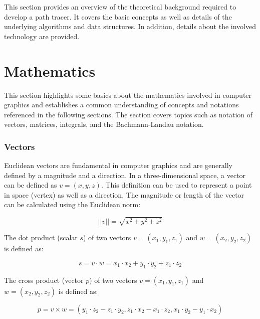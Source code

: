 \label{ch:theory}

This section provides an overview of the theoretical background required to develop a path tracer. It covers the basic concepts as well as details of the underlying algorithms and data structures. In addition, details about the involved technology are provided.

\section{Mathematics}

This section highlights some basics about the mathematics involved in computer graphics and establishes a common understanding of concepts and notations referenced in the following sections. The section covers topics such as notation of vectors, matrices, integrals, and the Bachmann-Landau notation.

\subsubsection{Vectors}

Euclidean vectors are fundamental in computer graphics and are generally defined by a magnitude and a direction. In a three-dimensional space, a vector can be defined as $v = (x, y, z)$. This definition can be used to represent a point in space (vertex) as well as a direction. The magnitude or length of the vector can be calculated using the Euclidean norm:

\begin{equation}
  \label{eqn:euclidean-norm}
  ||v|| = \sqrt{x^2 + y^2 + z^2}
\end{equation}

The dot product (scalar $s$) of two vectors $v = (x_1, y_1, z_1)$ and $w = (x_2, y_2, z_2)$ is defined as:

\begin{equation}
  \label{eqn:dot-product}
  s = v \cdot w = x_1 \cdot x_2 + y_1 \cdot y_2 + z_1 \cdot z_2
\end{equation}

The cross product (vector $p$) of two vectors $v = (x_1, y_1, z_1)$ and $w = (x_2, y_2, z_2)$ is defined as:

\begin{equation}
  \label{eqn:cross-product}
  p = v \times w = (y_1 \cdot z_2 - z_1 \cdot y_2, z_1 \cdot x_2 - x_1 \cdot z_2, x_1 \cdot y_2 - y_1 \cdot x_2)
\end{equation}

